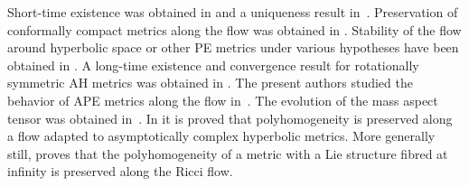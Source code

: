 Short-time existence was obtained in \cite{WXShi} and a uniqueness result in~\cite{Chen-Zhu}. Preservation of
conformally compact metrics along the flow was obtained in \cite{Bahuaud}. Stability of the flow around hyperbolic space
or other PE metrics under various hypotheses have been obtained in \cite{Bamler,QSW,SSS}. A long-time existence and
convergence result for rotationally symmetric AH metrics was obtained in \cite{BahuaudWoolgar}. The present authors
studied the behavior of APE metrics along the flow in~\cite{BMW}. The evolution of the mass aspect tensor was obtained in~\cite{BW}. In \cite{R} it is proved that polyhomogeneity is preserved along a flow adapted to asymptotically complex hyperbolic metrics. More generally still, \cite{Ammar} proves that the polyhomogeneity of a metric with a Lie structure fibred at infinity is preserved along the Ricci flow.

